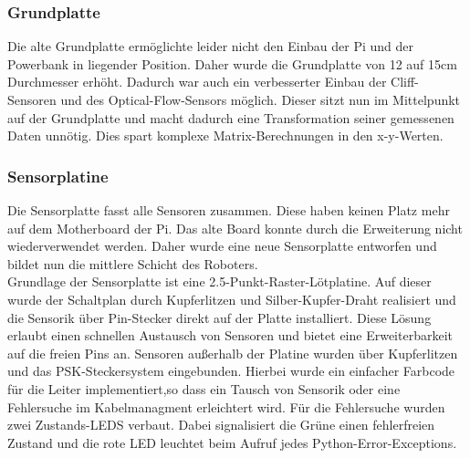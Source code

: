 \documentclass[twoside,12pt,a4paper]{report}
\begin{document}
	
	\subsubsection{Grundplatte}
	Die alte Grundplatte ermöglichte leider nicht den Einbau der Pi und der Powerbank in liegender Position. Daher wurde die Grundplatte von 12 auf 15cm Durchmesser erhöht. Dadurch war auch ein verbesserter Einbau der Cliff-Sensoren und des Optical-Flow-Sensors möglich. Dieser sitzt nun im Mittelpunkt auf der Grundplatte und macht dadurch eine Transformation seiner gemessenen Daten unnötig. Dies spart komplexe Matrix-Berechnungen in den x-y-Werten. 
	
	\subsubsection{Sensorplatine}
	Die Sensorplatte fasst alle Sensoren zusammen. Diese haben keinen Platz mehr auf dem Motherboard der Pi. Das alte Board konnte durch die Erweiterung nicht wiederverwendet werden. Daher wurde eine neue Sensorplatte entworfen und bildet nun die mittlere Schicht des Roboters. \\
	Grundlage der Sensorplatte ist eine 2.5-Punkt-Raster-Lötplatine. Auf dieser wurde der Schaltplan durch Kupferlitzen und Silber-Kupfer-Draht realisiert und die Sensorik über Pin-Stecker direkt auf der Platte installiert. Diese Lösung erlaubt einen schnellen Austausch von Sensoren und bietet eine Erweiterbarkeit auf die freien Pins an. Sensoren außerhalb der Platine wurden über Kupferlitzen und das PSK-Steckersystem eingebunden. Hierbei wurde ein einfacher Farbcode für die Leiter implementiert,so dass ein Tausch von Sensorik oder eine Fehlersuche im Kabelmanagment erleichtert wird. Für die Fehlersuche wurden zwei Zustands-LEDS verbaut. Dabei signalisiert die Grüne einen fehlerfreien Zustand und die rote LED leuchtet beim Aufruf jedes Python-Error-Exceptions. 
	
\end{document}
